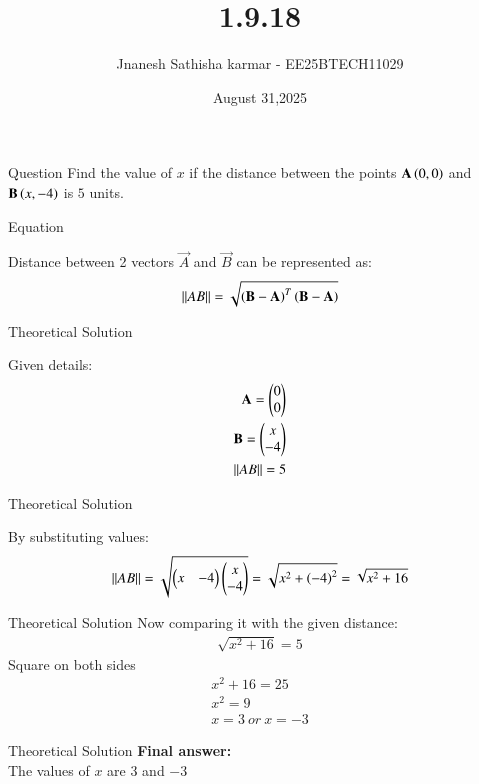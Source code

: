 \documentclass{beamer}
\title %
{1.9.18}
\date{August 31,2025}
\author 
{Jnanesh Sathisha karmar - EE25BTECH11029}
\begin{document}
\frame{\titlepage}
\begin{frame}{Question}
Find the value of $x$ if the distance between the points $\mathbf{A}\left(0, 0\right)$ and $\mathbf{B}\left(x, -4\right)$ is $5$ units.
\end{frame}



\begin{frame}{Equation}

Distance between 2 vectors $\vec{A}$ and $\vec{B}$ can be represented as:
\begin{align}
    \left\lVert AB\right\rVert=\sqrt{\left(\mathbf{B}-\mathbf{A}\right)^T\left(\mathbf{B}-\mathbf{A}\right)}
\end{align}
\end{frame}

\begin{frame}{Theoretical Solution}

Given details:
\begin{align}
    \mathbf{A}=\begin{pmatrix}0\\0\end{pmatrix}\\  \mathbf{B}=\begin{pmatrix}x\\-4\end{pmatrix}\\ \left\lVert AB\right\rVert=5 
\end{align}
\end{frame}

\begin{frame}{Theoretical Solution}

By substituting values:
\begin{align}
    \left\lVert AB\right\rVert=\sqrt{\begin{pmatrix}x & -4\end{pmatrix}\begin{pmatrix}x \\-4\end{pmatrix}}=\sqrt{x^2 + \left(-4\right)^2}=\sqrt{x^2+16}
\end{align}

\end{frame}


\begin{frame}{Theoretical Solution}
Now comparing it with the given distance:
\begin{align}
    \sqrt{x^2+16}=5
\end{align}
Square on both sides
\begin{align}
    x^2 +16=25\\
    x^2=9\\
    x=3\  or\ x=-3 
\end{align}

\end{frame}
\begin{frame}{Theoretical Solution}
\textbf{Final answer:}\\
The values of $x$ are $3$ and $-3$
\end{frame}
\end{document}
